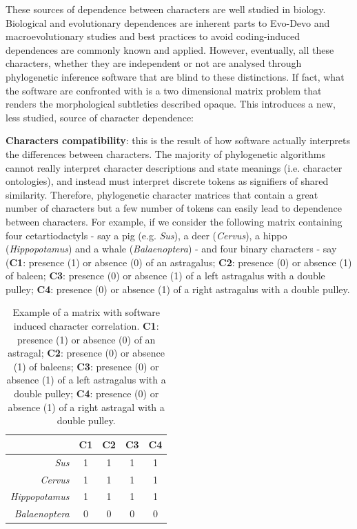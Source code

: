 \documentclass[12pt,letterpaper]{article}
\begin{document}
These sources of dependence between characters are well studied in biology.
Biological and evolutionary dependences are inherent parts to Evo-Devo and macroevolutionary studies and best practices to avoid coding-induced dependences are commonly known and applied.
However, eventually, all these characters, whether they are independent or not are analysed through phylogenetic inference software that are blind to these distinctions.
If fact, what the software are confronted with is a two dimensional matrix problem that renders the morphological subtleties described opaque.
This introduces a new, less studied, source of character dependence:

\noindent \textbf{Characters compatibility}: this is the result of how software actually interprets the differences between characters.
The majority of phylogenetic algorithms cannot really interpret character descriptions and state meanings (i.e. character ontologies), and instead must interpret discrete tokens as signifiers of shared similarity.
Therefore, phylogenetic character matrices that contain a great number of characters but a few number of tokens can easily lead to dependence between characters.
For example, if we consider the following matrix containing four cetartiodactyls - say a pig (e.g. \textit{Sus}), a deer (\textit{Cervus}), a hippo (\textit{Hippopotamus}) and a whale (\textit{Balaenoptera}) - and four binary characters - say (\textbf{C1}: presence (1) or absence (0) of an astragalus; \textbf{C2}: presence (0) or absence (1) of baleen; \textbf{C3}: presence (0) or absence (1) of a left astragalus with a double pulley; \textbf{C4}: presence (0) or absence (1) of a right astragalus with a double pulley.

\begin{table}
\center
    \begin{tabular}{r|cccc}
            & C1 & C2 & C3 & C4\\
        \hline
        \textit{Sus} & 1 & 1 & 1 & 1\\
        \textit{Cervus} & 1 & 1 & 1 & 1\\
        \textit{Hippopotamus} & 1 & 1 & 1 & 1\\
        \textit{Balaenoptera} & 0 & 0 & 0 & 0\\
    \end{tabular}
    \caption{Example of a matrix with software induced character correlation. \textbf{C1}: presence (1) or absence (0) of an astragal; \textbf{C2}: presence (0) or absence (1) of baleens; \textbf{C3}: presence (0) or absence (1) of a left astragalus with a double pulley; \textbf{C4}: presence (0) or absence (1) of a right astragal with a double pulley.}
    \label{Tab:example_matrix}
\end{table}
\end{document}
